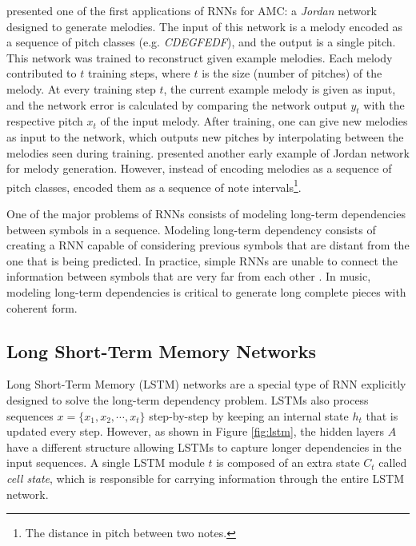\citet{todd1989connectionist} presented one of the first applications of RNNs for AMC: a \textit{Jordan} network designed to generate melodies. The input of this network is a melody encoded as a sequence of pitch classes (e.g. \textit{CDEGFEDF}), and the output is a single pitch. This network was trained to reconstruct given example melodies. Each melody contributed to $t$ training steps, where $t$ is the size (number of pitches) of the melody. At every training step $t$, the current example melody is given as input, and the network error is calculated by comparing the network output $y_t$ with the respective pitch $x_t$ of the input melody. After training, one can give new melodies as input to the network, which outputs new pitches by interpolating between the melodies seen during training. \citet{duff1989backpropagation} presented another early example of Jordan network for melody generation. However, instead of encoding melodies as a sequence of pitch classes, \citet{duff1989backpropagation} encoded them as a sequence of note intervals\footnote{The distance in pitch between two notes.}.

One of the major problems of RNNs consists of modeling long-term dependencies between symbols in a sequence. Modeling long-term dependency consists of creating a RNN capable of considering previous symbols that are distant from the one that is being predicted. In practice, simple RNNs are unable to connect the information between symbols that are very far from each other \cite{bengio1994}. In music, modeling long-term dependencies is critical to generate long complete pieces with coherent form.

\subsection{Long Short-Term Memory Networks}
\label{sec:lstm}

Long Short-Term Memory (LSTM) networks \cite{hochreiter1997long} are a special type of RNN explicitly designed to solve the long-term dependency problem. LSTMs also process sequences $x = \{x_1, x_2, \cdots, x_t\}$ step-by-step by keeping an internal state $h_t$ that is updated every step. However, as shown in Figure \ref{fig:lstm}, the hidden layers $A$ have a different structure allowing LSTMs to capture longer dependencies in the input sequences.
A single LSTM module $t$ is composed of an extra state $C_t$ called \textit{cell state}, which is responsible for carrying information through the entire LSTM network.

